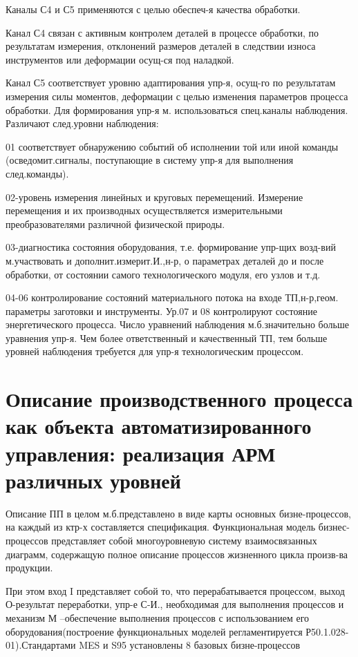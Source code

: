 \documentclass[unicode, 12pt, a4paper, oneside]{article}
\begin{document}
Каналы С4 и С5 применяются с целью обеспеч-я качества обработки.

Канал С4 связан с активным контролем деталей в процессе обработки, по результатам измерения, отклонений размеров деталей в следствии износа инструментов или деформации осущ-ся под наладкой.

Канал С5 соответствует уровню адаптирования упр-я, осущ-го по результатам измерения силы моментов, деформации с целью изменения параметров процесса обработки.
Для формирования упр-я м. использоваться спец.каналы наблюдения. Различают след.уровни наблюдения:

01 соответствует обнаружению событий об исполнении той или иной команды (осведомит.сигналы, поступающие в систему упр-я для выполнения след.команды).

02-уровень измерения линейных и круговых перемещений. Измерение перемещения и их производных осуществляется измерительными преобразователями различной физической природы.

03-диагностика состояния оборудования, т.е. формирование упр-щих возд-вий м.участвовать и дополнит.измерит.И.,н-р, о параметрах деталей до и после обработки, от состоянии самого технологического модуля, его узлов и т.д.

04-06 контролирование состояний материального потока на входе ТП,н-р,геом. параметры заготовки и инструменты.
Ур.07 и 08 контролируют состояние энергетического процесса. Число уравнений наблюдения м.б.значительно больше уравнения упр-я. Чем более ответственный и качественный ТП, тем больше уровней наблюдения требуется для упр-я технологическим процессом.

\section{Описание производственного процесса как объекта автоматизированного управления: реализация АРМ различных уровней}

Описание ПП в целом м.б.представлено в виде карты основных бизне-процессов, на каждый из ктр-х составляется спецификация. Функциональная модель бизнес-процессов представляет собой многоуровневую систему взаимосвязанных диаграмм, содержащую полное описание процессов жизненного цикла произв-ва продукции.

При этом вход I представляет собой то, что перерабатывается процессом, выход О-результат переработки, упр-е С-И., необходимая для выполнения процессов и механизм М –обеспечение выполнения процессов с использованием его оборудования(построение функциональных моделей регламентируется Р50.1.028-01).Стандартами MES и S95 установлены 8 базовых бизне-процессов
\end{document}
